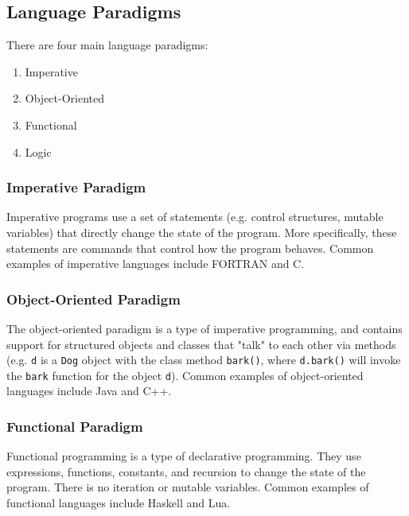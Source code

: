 \documentclass{article}
\begin{document}
\subsection{Language Paradigms} There are four main language paradigms:
\begin{enumerate}[label=(\roman*),align=left]
\item Imperative
\item Object-Oriented
\item Functional
\item Logic
\end{enumerate}





\subsubsection{Imperative Paradigm} Imperative programs use a set of
statements (e.g. control structures, mutable variables) that directly
change the state of the program. More specifically, these statements
are commands that control how the program behaves. Common examples of
imperative languages include FORTRAN and C.





\subsubsection{Object-Oriented Paradigm} The object-oriented paradigm
is a type of imperative programming, and contains support for
structured objects and classes that "talk" to each other via methods
(e.g. \texttt{d} is a \texttt{Dog} object with the class method
\texttt{bark()}, where \texttt{d.bark()} will invoke the \texttt{bark}
function for the object \texttt{d}). Common examples of
object-oriented languages include Java and C++.





\subsubsection{Functional Paradigm} Functional programming is a type of
declarative programming. They use expressions, functions, constants,
and recursion to change the state of the program. There is no
iteration or mutable variables. Common examples of functional
languages include Haskell and Lua.
\end{document}
